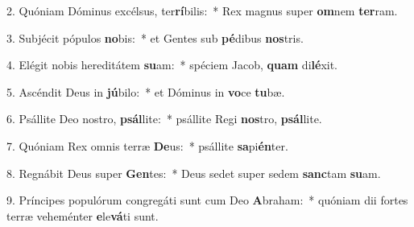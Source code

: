2. Quóniam Dóminus excélsus, ter\textbf{rí}bilis:~*  Rex magnus super \textbf{om}nem \textbf{ter}ram.\

3. Subjécit pópulos \textbf{no}bis:~*  et Gentes sub \textbf{pé}dibus \textbf{nos}tris.\

4. Elégit nobis hereditátem \textbf{su}am:~*  spéciem Jacob, \textbf{quam} di\textbf{lé}xit.\

5. Ascéndit Deus in \textbf{jú}bilo:~*  et Dóminus in \textbf{vo}ce \textbf{tu}bæ.\

6. Psállite Deo nostro, \textbf{psál}lite:~*  psállite Regi \textbf{nos}tro, \textbf{psál}lite.\

7. Quóniam Rex omnis terræ \textbf{De}us:~*  psállite \textbf{sa}pi\textbf{én}ter.\

8. Regnábit Deus super \textbf{Gen}tes:~*  Deus sedet super sedem \textbf{sanc}tam \textbf{su}am.\

9. Príncipes populórum congregáti sunt cum Deo \textbf{A}braham:~*  quóniam dii fortes terræ veheménter \textbf{e}le\textbf{vá}ti sunt.\

